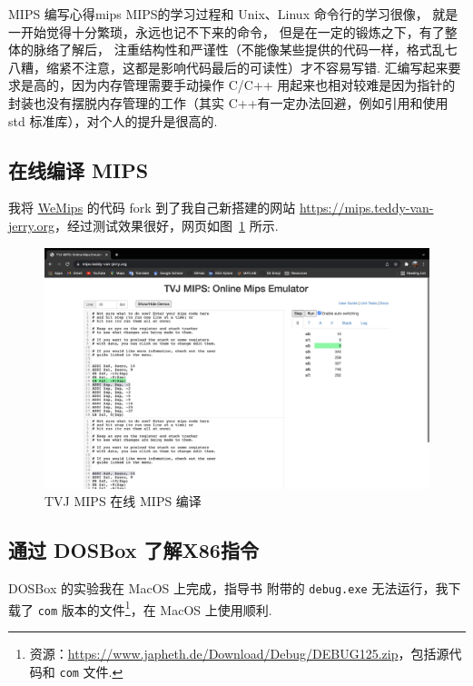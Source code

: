 \documentclass[11pt]{SEU-Digital-Report}
\begin{document}
      \begin{analyze}{MIPS 编写心得}{mips}
          MIPS的学习过程和 Unix、Linux 命令行的学习很像，
          就是一开始觉得十分繁琐，永远也记不下来的命令，
          但是在一定的锻炼之下，有了整体的脉络了解后，
          注重结构性和严谨性（不能像某些提供的代码一样，格式乱七八糟，缩紧不注意，这都是影响代码最后的可读性）才不容易写错.
          汇编写起来要求是高的，因为内存管理需要手动操作
          C/C++ 用起来也相对较难是因为指针的封装也没有摆脱内存管理的工作（其实 C++有一定办法回避，例如引用和使用 std 标准库），对个人的提升是很高的.
      \end{analyze}

    \newpage

    \subsection{在线编译 MIPS}

    我将 \href{https://rivoire.cs.sonoma.edu/cs351/wemips/}{WeMips} 的代码 fork 到了我自己新搭建的网站 \url{https://mips.teddy-van-jerry.org}，经过测试效果很好，网页如图~\ref{fig:mips_online} 所示.

    \begin{figure}[htbp]
      \centering
      \includegraphics[width=\linewidth,frame]{fig/mips_online.png}
      \caption{TVJ MIPS 在线 MIPS 编译}
      \label{fig:mips_online}
    \end{figure}
      

    \subsection{通过 DOSBox 了解X86指令}

      DOSBox 的实验我在 MacOS 上完成，指导书\cite{guide} 附带的 \texttt{debug.exe} 无法运行，我下载了 \texttt{com} 版本的文件\footnote{资源：\url{https://www.japheth.de/Download/Debug/DEBUG125.zip}，包括源代码和 \texttt{com} 文件.}，在 MacOS 上使用顺利.
\end{document}
